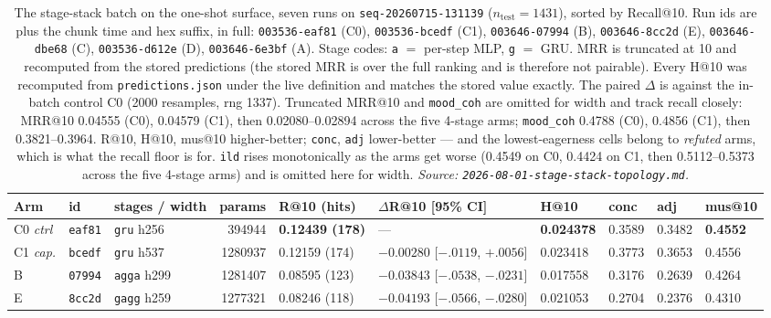 \documentclass[11pt]{article}
\newcommand{\runid}[1]{\texttt{\small\seqsplit{#1}}}
\newcommand{\dsid}[1]{\texttt{\small #1}}
\newcommand{\best}[1]{\textbf{#1}}
\begin{document}
\begin{table}[ht]
  \centering
  \caption{The stage-stack batch on the one-shot surface, seven runs on
  \dsid{seq-20260715-131139} ($n_{\mathrm{test}}=\num{1431}$), sorted by
  Recall@10. Run ids are \protect\runid{run-20260801-} plus the chunk time and hex
  suffix, in full: \texttt{003536-eaf81} (C0), \texttt{003536-bcedf} (C1),
  \texttt{003646-07994} (B), \texttt{003646-8cc2d} (E), \texttt{003646-dbe68} (C),
  \texttt{003536-d612e} (D), \texttt{003646-6e3bf} (A). Stage codes: \texttt{a}
  $=$ per-step MLP, \texttt{g} $=$ GRU. MRR is truncated at \num{10} and
  recomputed from the stored predictions (the stored MRR is over the full ranking
  and is therefore not pairable). Every H@10 was recomputed from
  \texttt{predictions.json} under the live definition and matches the stored value
  exactly. The paired $\Delta$ is against the in-batch control C0 (\num{2000}
  resamples, rng \num{1337}). Truncated MRR@10 and \texttt{mood\_coh} are omitted
  for width and track recall closely: MRR@10 \num{0.04555} (C0), \num{0.04579}
  (C1), then \numrange{0.02080}{0.02894} across the five 4-stage arms;
  \texttt{mood\_coh} \num{0.4788} (C0), \num{0.4856} (C1), then
  \numrange{0.3821}{0.3964}. R@10, H@10, mus@10
  higher-better; \texttt{conc}, \texttt{adj} lower-better --- and the
  lowest-eagerness cells belong to \emph{refuted} arms, which is what the recall
  floor is for. \texttt{ild} rises monotonically as the arms get worse
  (\num{0.4549} on C0, \num{0.4424} on C1, then \numrange{0.5112}{0.5373} across
  the five 4-stage arms) and is omitted here for width.
  \emph{Source: \texttt{2026-08-01-stage-stack-topology.md}.}}
  \label{tab:nexttrack-stagestack-s1}
  {\scriptsize\setlength{\tabcolsep}{2.0pt}\begin{tabular}{lllrllllll}
    \toprule
    Arm & id & stages / width & params & R@10 (hits) & $\Delta$R@10 [95\% CI] & H@10 & conc & adj & mus@10 \\
    \midrule
    C0 \emph{ctrl} & \texttt{eaf81} & \texttt{gru} h256 & \num{394944} & \best{0.12439 (178)} & --- & \best{0.024378} & 0.3589 & 0.3482 & \best{0.4552} \\
    C1 \emph{cap.} & \texttt{bcedf} & \texttt{gru} h537 & \num{1280937} & 0.12159 (174) & $-0.00280$ [$-.0119$, $+.0056$] & 0.023418 & 0.3773 & 0.3653 & 0.4556 \\
    B & \texttt{07994} & \texttt{agga} h299 & \num{1281407} & 0.08595 (123) & $-0.03843$ [$-.0538$, $-.0231$] & 0.017558 & 0.3176 & 0.2639 & 0.4264 \\
    E & \texttt{8cc2d} & \texttt{gagg} h259 & \num{1277321} & 0.08246 (118) & $-0.04193$ [$-.0566$, $-.0280$] & 0.021053 & 0.2704 & 0.2376 & 0.4310 \\

\end{tabular}}
\end{table}
\end{document}
